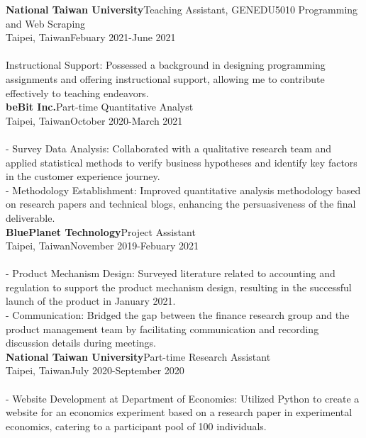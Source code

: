 \documentclass{article}
\begin{document}
\noindent\textbf{National Taiwan University}\hfill Teaching Assistant, GENEDU5010 Programming and Web Scraping\\
Taipei, Taiwan\hfill Febuary 2021-June 2021\\\\
Instructional Support: Possessed a background in designing programming assignments and offering instructional support, allowing me to contribute effectively to teaching endeavors.\\

\noindent\textbf{beBit Inc.}\hfill Part-time Quantitative Analyst\\
Taipei, Taiwan\hfill October 2020-March 2021\\\\
- Survey Data Analysis: Collaborated with a qualitative research team and applied statistical methods to verify business hypotheses and identify key factors in the customer experience journey.\\ - Methodology Establishment: Improved quantitative analysis methodology based on research papers and technical blogs, enhancing the persuasiveness of the final deliverable.\\

\noindent\textbf{BluePlanet Technology}\hfill Project Assistant\\
Taipei, Taiwan\hfill November 2019-Febuary 2021\\\\
- Product Mechanism Design: Surveyed literature related to accounting and regulation to support the product mechanism design, resulting in the successful launch of the product in January 2021.\\ - Communication: Bridged the gap between the finance research group and the product management team by facilitating communication and recording discussion details during meetings.\\

\noindent\textbf{National Taiwan University}\hfill Part-time Research Assistant\\
Taipei, Taiwan\hfill July 2020-September 2020\\\\
- Website Development at Department of Economics: Utilized Python to create a website for an economics experiment based on a research paper in experimental economics, catering to a participant pool of 100 individuals.\\
\end{document}
